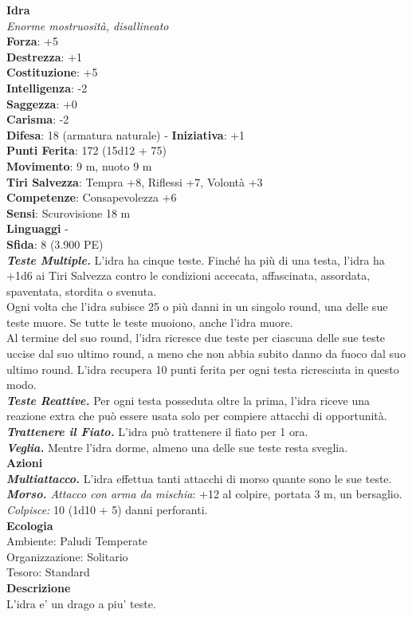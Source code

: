 \begin{multicols}{2}
\medskip\textbf{Idra}\\
\emph{Enorme mostruosità, disallineato}\\
\textbf{Forza}: +5\\
\textbf{Destrezza}: +1\\
\textbf{Costituzione}: +5\\
\textbf{Intelligenza}: -2\\
\textbf{Saggezza}: +0\\
\textbf{Carisma}: -2\\
\textbf{Difesa}: 18 (armatura naturale) - \textbf{Iniziativa}: +1\\
\textbf{Punti Ferita}: 172 (15d12 + 75)\\
\textbf{Movimento}: 9 m, nuoto 9 m\\
\textbf{Tiri Salvezza}: Tempra +8, Riflessi +7, Volontà +3\\
\textbf{Competenze}: Consapevolezza +6\\
\textbf{Sensi}: Scurovisione 18 m\\
\textbf{Linguaggi} -\\
\textbf{Sfida}: 8 (3.900 PE)\smallskip\\
\emph{\textbf{Teste Multiple.}} L'idra ha cinque teste. Finché ha più di una testa, l'idra ha +1d6 ai Tiri Salvezza contro le condizioni accecata, affascinata, assordata, spaventata, stordita o svenuta.\\
Ogni volta che l'idra subisce 25 o più danni in un singolo round, una delle sue teste muore. Se tutte le teste muoiono, anche l'idra muore.\\
Al termine del suo round, l'idra ricresce due teste per ciascuna delle sue teste uccise dal suo ultimo round, a meno che non abbia subito danno da fuoco dal suo ultimo round. L'idra recupera 10 punti ferita per ogni testa ricresciuta in questo modo.\\
\emph{\textbf{Teste Reattive.}} Per ogni testa posseduta oltre la prima, l'idra riceve una reazione extra che può essere usata solo per compiere attacchi di opportunità.\\
\emph{\textbf{Trattenere il Fiato.}} L'idra può trattenere il fiato per 1 ora.\\
\emph{\textbf{Veglia.}} Mentre l'idra dorme, almeno una delle sue teste resta sveglia.\\
\smallskip\textbf{Azioni}\\
\emph{\textbf{Multiattacco.}} L'idra effettua tanti attacchi di morso quante sono le sue teste.\\
\emph{\textbf{Morso.} Attacco con arma da mischia}: +12 al colpire, portata 3 m, un bersaglio.\\
\emph{Colpisce:} 10 (1d10 + 5) danni perforanti. \\
\textbf{Ecologia}\\
Ambiente: Paludi Temperate\\
Organizzazione: Solitario\\
Tesoro: Standard\\
\textbf{Descrizione}\\
L'idra e' un drago a piu' teste.\\


\end{multicols}
